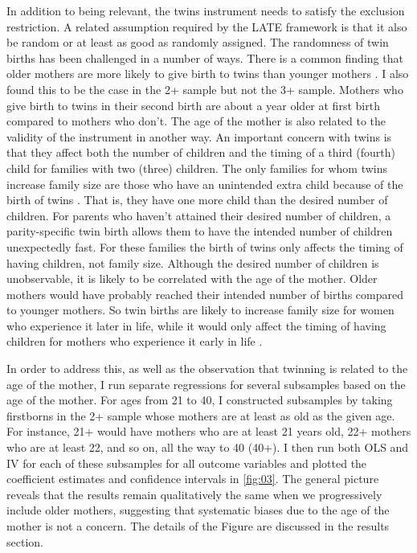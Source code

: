 In addition to being relevant, the twins instrument needs to satisfy the exclusion restriction. A related assumption required by the LATE framework is that it also be random or at least as good as randomly assigned. The randomness of twin births has been challenged in a number of ways. There is a common finding that older mothers are more likely to give birth to twins than younger mothers \parencite{angrist_multiple_2010}. I also found this to be the case in the 2+ sample but not the 3+ sample. Mothers who give birth to twins in their second birth are about a year older at first birth compared to mothers who don’t. The age of the mother is also related to the validity of the instrument in another way. An important concern with twins is that they affect both the number of children and the timing of a third (fourth) child for families with two (three) children. The only families for whom twins increase family size are those who have an unintended extra child because of the birth of twins \parencite{oberg_casual_2021}. That is, they have one more child than the desired number of children. For parents who haven’t attained their desired number of children, a parity-specific twin birth allows them to have the intended number of children unexpectedly fast. For these families the birth of twins only affects the timing of having children, not family size. Although the desired number of children is unobservable, it is likely to be correlated with the age of the mother. Older mothers would have probably reached their intended number of births compared to younger mothers. So twin births are likely to increase family size for women who experience it later in life, while it would only affect the timing of having children for mothers who experience it early in life \parencite{caceres-delpiano_impacts_2006}. 

In order to address this, as well as the observation that twinning is related to the age of the mother, I run separate regressions for several subsamples based on the age of the mother.  For ages from 21 to 40, I constructed subsamples by taking firstborns in the 2+ sample whose mothers are at least as old as the given age. For instance, 21+ would have mothers who are at least 21 years old, 22+ mothers who are at least 22, and so on, all the way to 40 (40+). I then run both OLS and IV for each of these subsamples for all outcome variables and plotted the coefficient estimates and confidence intervals in \autoref{fig:03}. The general picture reveals that the results remain qualitatively the same when we progressively include older mothers, suggesting that systematic biases due to the age of the mother is not a concern. The details of the Figure are discussed in the results section.

